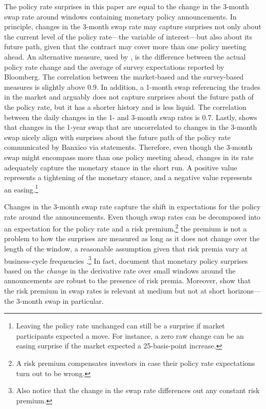 \documentclass[a4paper,12pt]{article} 		%
\begin{document}
The policy rate surprises in this paper are equal to the change in the 3-month swap rate around windows containing monetary policy announcements. In principle, changes in the 3-month swap rate may capture surprises not only about the current level of the policy rate---the variable of interest---but also about its future path, given that the contract may cover more than one policy meeting ahead. An alternative measure, used by \textcite{DePooter_etal:2014}, is the difference between the actual policy rate change and the average of survey expectations reported by Bloomberg. The correlation between the market-based and the survey-based measures is slightly above 0.9. In addition, a 1-month swap referencing the \tiie{} trades in the market and arguably does not capture surprises about the future path of the policy rate, but it has a shorter history and is less liquid. The correlation between the daily changes in the 1- and 3-month swap rates is 0.7. Lastly, \textcite{Solis:2F} shows that changes in the 1-year swap that are uncorrelated to changes in the 3-month swap nicely align with surprises about the future path of the policy rate communicated by Banxico via statements. Therefore, even though the 3-month swap might encompass more than one policy meeting ahead, changes in its rate adequately capture the monetary stance in the short run. A positive value represents a tightening of the monetary stance, and a negative value represents an easing.\footnote{Leaving the policy rate unchanged can still be a surprise if market participants expected a move. For instance, a zero raw change can be an easing surprise if the market expected a 25-basis-point increase.} 

Changes in the 3-month swap rate capture the shift in expectations for the policy rate around the announcements. Even though swap rates can be decomposed into an expectation for the policy rate and a risk premium,\footnote{A risk premium compensates investors in case their policy rate expectations turn out to be wrong.} the premium is not a problem to how the surprises are measured as long as it does not change over the length of the window, a reasonable assumption given that risk premia vary at business-cycle frequencies \parencite{PiazzesiSwanson:2008, GVRFSM:2019}.\footnote{ Also notice that the change in the swap rate differences out any constant risk premium.} In fact, \textcite{PiazzesiSwanson:2008} document that monetary policy surprises based on the \textit{change} in the derivative rate over small windows around the announcements are robust to the presence of risk premia. Moreover, \textcite{GVRFSM:2019} show that the risk premium in \tiie{} swap rates is relevant at medium but not at short horizons---the 3-month swap in particular.
\end{document}
